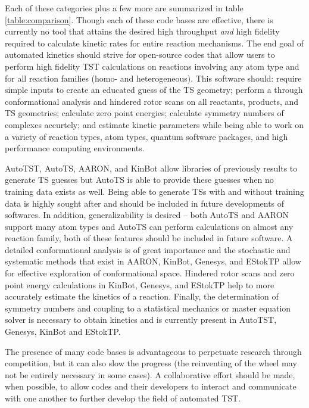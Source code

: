 \documentclass[preprint, 11pt]{elsarticle} %
\begin{document}
Each of these categories plus a few more are summarized in table \ref{table:comparison}. 
Though each of these code bases are effective, there is currently no tool that attains the desired high throughput \textit{and} high fidelity required to calculate kinetic rates for entire reaction mechanisms.
The end goal of automated kinetics should strive for open-source codes that allow users to perform high fidelity TST calculations on reactions involving any atom type and for all reaction families (homo- and heterogeneous).
This software should: require simple inputs to create an educated guess of the TS geometry; perform a through conformational analysis and hindered rotor scans on all reactants, products, and TS geometries; calculate zero point energies; calculate symmetry numbers of complexes accurtely; and estimate kinetic parameters while being able to work on a variety of reaction types, atom types, quantum software packages, and high performance computing environments.

AutoTST, AutoTS, AARON, and KinBot allow libraries of previously results to generate TS guesses but AutoTS is able to provide these guesses when no training data exists as well.
Being able to generate TSs with and without training data is highly sought after and should be included in future developments of softwares.
In addition, generalizability is desired -- both AutoTS and AARON support many atom types and AutoTS can perform calculations on almost any reaction family, both of these features should be included in future software.
A detailed conformational analysis is of great importance and the stochastic and systematic methods that exist in AARON, KinBot, Genesys, and EStokTP allow for effective exploration of conformational space.
Hindered rotor scans and zero point energy calculations in KinBot, Genesys, and EStokTP help to more accurately estimate the kinetics of a reaction.
Finally, the determination of symmetry numbers and coupling to a statistical mechanics or master equation solver is necessary to obtain kinetics and is currently present in AutoTST, Genesys, KinBot and EStokTP.

The presence of many code bases is advantageous to perpetuate research through competition, but it can also slow the progress (the reinventing of the wheel may not be entirely necessary in some cases).
A collaborative effort should be made, when possible, to allow codes and their developers to interact and communicate with one another to further develop the field of automated TST.
\end{document}
